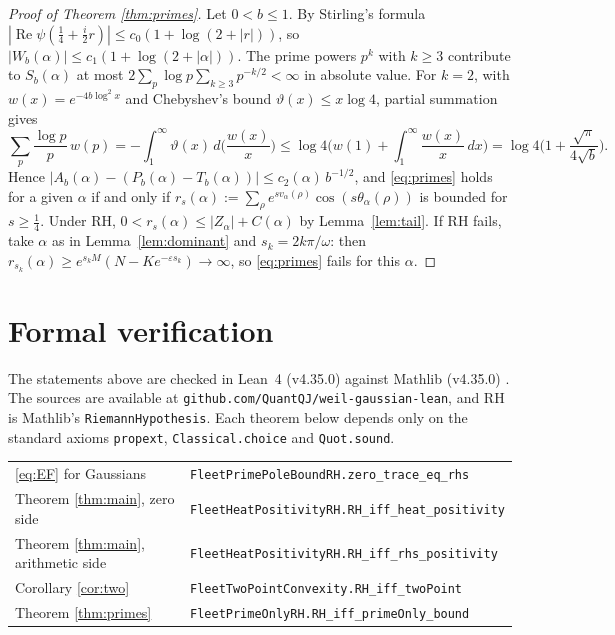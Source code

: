 \documentclass[11pt]{amsart}
\theoremstyle{remark}
\DeclareMathOperator{\re}{Re}
\begin{document}
\begin{proof}[Proof of Theorem \ref{thm:primes}]
Let $0<b\le1$. By Stirling's formula $|\re\psi(\tfrac14+\tfrac i2r)|\le c_0(1+\log(2+|r|))$, so
$|W_b(\alpha)|\le c_1(1+\log(2+|\alpha|))$. The prime powers $p^k$ with $k\ge3$ contribute to $S_b(\alpha)$ at most
$2\sum_p\log p\sum_{k\ge3}p^{-k/2}<\infty$ in absolute value. For $k=2$, with $w(x)=e^{-4b\log^2x}$ and Chebyshev's
bound $\vartheta(x)\le x\log4$, partial summation gives
\[
\sum_p\frac{\log p}{p}\,w(p)=-\int_1^\infty\vartheta(x)\,d\Big(\frac{w(x)}{x}\Big)
\le\log4\Big(w(1)+\int_1^\infty\frac{w(x)}{x}\,dx\Big)=\log4\Big(1+\frac{\sqrt\pi}{4\sqrt b}\Big).
\]
Hence $|A_b(\alpha)-(P_b(\alpha)-T_b(\alpha))|\le c_2(\alpha)\,b^{-1/2}$, and \eqref{eq:primes} holds for a given
$\alpha$ if and only if $r_s(\alpha):=\sum_\rho e^{sv_\alpha(\rho)}\cos(s\theta_\alpha(\rho))$ is bounded for
$s\ge\tfrac14$. Under RH, $0<r_s(\alpha)\le|Z_\alpha|+C(\alpha)$ by Lemma~\ref{lem:tail}. If RH fails, take $\alpha$
as in Lemma~\ref{lem:dominant} and $s_k=2k\pi/\omega$: then
$r_{s_k}(\alpha)\ge e^{s_kM}(N-Ke^{-\varepsilon s_k})\to\infty$, so \eqref{eq:primes} fails for this $\alpha$.
\end{proof}

\section{Formal verification}
\begin{sloppypar}
The statements above are checked in Lean~4 (v4.35.0) against Mathlib (v4.35.0) \cite{mathlib}. The
sources are available at \texttt{github.com/QuantQJ/weil-gaussian-lean}, and RH is Mathlib's
\texttt{RiemannHypothesis}. Each theorem below depends only on the standard axioms \texttt{propext},
\texttt{Classical.choice} and \texttt{Quot.sound}.
\end{sloppypar}

\smallskip
\begin{center}
\begin{tabular}{ll}
\eqref{eq:EF} for Gaussians & \texttt{FleetPrimePoleBoundRH.zero\_trace\_eq\_rhs}\\
Theorem \ref{thm:main}, zero side & \texttt{FleetHeatPositivityRH.RH\_iff\_heat\_positivity}\\
Theorem \ref{thm:main}, arithmetic side & \texttt{FleetHeatPositivityRH.RH\_iff\_rhs\_positivity}\\
Corollary \ref{cor:two} & \texttt{FleetTwoPointConvexity.RH\_iff\_twoPoint}\\
Theorem \ref{thm:primes} & \texttt{FleetPrimeOnlyRH.RH\_iff\_primeOnly\_bound}
\end{tabular}
\end{center}
\smallskip
\end{document}
